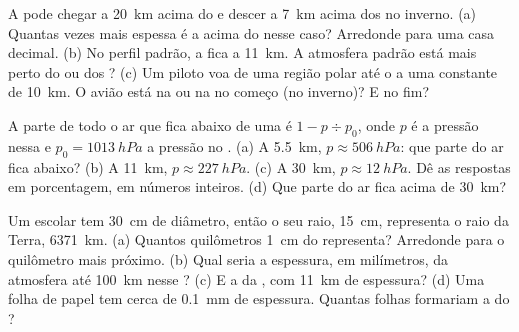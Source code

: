 \begin{exercise}[$\star\star$]\label{exo:g8:the-atmosphere:10}
A  pode chegar a \qty{20}{km} acima do  e descer a
\qty{7}{km} acima dos  no inverno. (a) Quantas vezes mais espessa é
a  acima do  nesse caso? Arredonde para uma casa
decimal. (b) No perfil padrão, a  fica a \qty{11}{km}. A
atmosfera padrão está mais perto do  ou dos ? (c) Um piloto
voa de uma região polar até o  a uma  constante de
\qty{10}{km}. O avião está na  ou na  no começo (no
inverno)? E no fim?
\end{exercise}

\begin{exercise}[$\star\star\star$]\label{exo:g8:the-atmosphere:11}
A parte de todo o ar que fica abaixo de uma  é $1 - p \div
p_0$, onde $p$ é a pressão nessa  e $p_0 =
\qty{1013}{hPa}$ a pressão no . (a) A \qty{5.5}{km}, $p
\approx \qty{506}{hPa}$: que parte do ar fica abaixo? (b) A
\qty{11}{km}, $p \approx \qty{227}{hPa}$. (c) A \qty{30}{km}, $p \approx
\qty{12}{hPa}$. Dê as respostas em porcentagem, em números inteiros. (d) Que parte do ar fica acima de \qty{30}{km}?
\end{exercise}

\begin{exercise}[$\star\star\star$]\label{exo:g8:the-atmosphere:12}
Um  escolar tem \qty{30}{cm} de diâmetro, então o seu raio,
\qty{15}{cm}, representa o raio da Terra, \qty{6371}{km}. (a) Quantos
quilômetros \qty{1}{cm} do  representa? Arredonde para o quilômetro
mais próximo. (b) Qual seria a espessura, em milímetros, da atmosfera até
\qty{100}{km} nesse ? (c) E a da , com \qty{11}{km} de
espessura? (d) Uma folha de papel tem cerca de \qty{0.1}{mm} de
espessura. Quantas folhas formariam a  do ?
\end{exercise}

